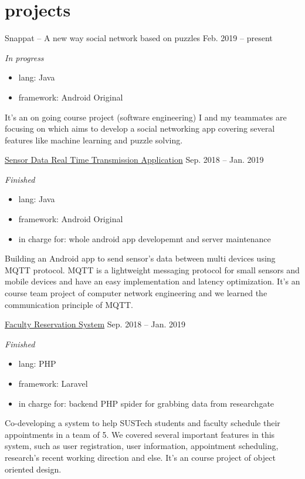 \documentclass[hidelinks__VERSION__]{adamyi-cv}
\begin{document}
\pagebreak


\section{projects}

\begin{entrylist}


\entry
{Snappat -- A new way social network based on puzzles}
{Feb. 2019 -- present}
{\emph{In progress}
\begin{itemize}
    \item lang: Java
    \item framework: Android Original
\end{itemize}
It's an on going course project (software engineering) I and my teammates are focusing on which aims to develop a social networking app covering several features like machine learning and puzzle solving.
}


\entry
{\href{https://github.com/hackroid/MqttSensorDemo}{Sensor Data Real Time Transmission Application}}
{Sep. 2018 -- Jan. 2019}
{\emph{Finished}
\begin{itemize}
    \item lang: Java
    \item framework: Android Original
    \item in charge for: whole android app developemnt and server maintenance
\end{itemize}
Building an Android app to send sensor's data between multi devices using MQTT protocol. MQTT is a lightweight messaging protocol for small sensors and mobile devices and have an easy implementation and latency optimization. It's an course team project of computer network engineering and we learned the communication principle of MQTT.
}


\entry
{\href{https://github.com/zhaoweizhong/Faculty-Reservation}{Faculty Reservation System}}
{Sep. 2018 -- Jan. 2019}
{\emph{Finished}
\begin{itemize}
    \item lang: PHP
    \item framework: Laravel
    \item in charge for: backend PHP spider for grabbing data from researchgate
\end{itemize}
Co-developing a system to help SUSTech students and faculty schedule their appointments in a team of 5. We covered several important features in this system, such as user registration, user information, appointment scheduling, research's recent working direction and else. It's an course project of object oriented design.
}



\end{entrylist}
\end{document}
